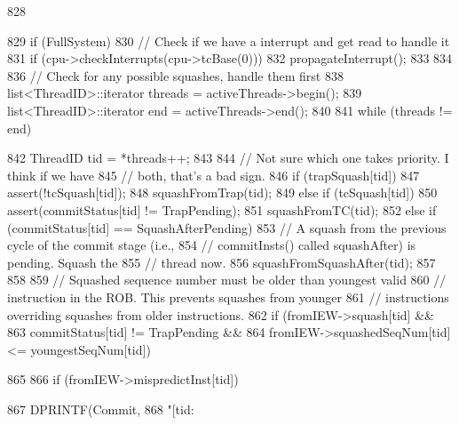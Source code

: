\begin{DoxyCode}
828 {
829     if (FullSystem) {
830         // Check if we have a interrupt and get read to handle it
831         if (cpu->checkInterrupts(cpu->tcBase(0)))
832             propagateInterrupt();
833     }
834 
836     // Check for any possible squashes, handle them first
838     list<ThreadID>::iterator threads = activeThreads->begin();
839     list<ThreadID>::iterator end = activeThreads->end();
840 
841     while (threads != end) {
842         ThreadID tid = *threads++;
843 
844         // Not sure which one takes priority.  I think if we have
845         // both, that's a bad sign.
846         if (trapSquash[tid]) {
847             assert(!tcSquash[tid]);
848             squashFromTrap(tid);
849         } else if (tcSquash[tid]) {
850             assert(commitStatus[tid] != TrapPending);
851             squashFromTC(tid);
852         } else if (commitStatus[tid] == SquashAfterPending) {
853             // A squash from the previous cycle of the commit stage (i.e.,
854             // commitInsts() called squashAfter) is pending. Squash the
855             // thread now.
856             squashFromSquashAfter(tid);
857         }
858 
859         // Squashed sequence number must be older than youngest valid
860         // instruction in the ROB. This prevents squashes from younger
861         // instructions overriding squashes from older instructions.
862         if (fromIEW->squash[tid] &&
863             commitStatus[tid] != TrapPending &&
864             fromIEW->squashedSeqNum[tid] <= youngestSeqNum[tid]) {
865 
866             if (fromIEW->mispredictInst[tid]) {
867                 DPRINTF(Commit,
868                     "[tid:%
      
}}}}
\end{DoxyCode}
